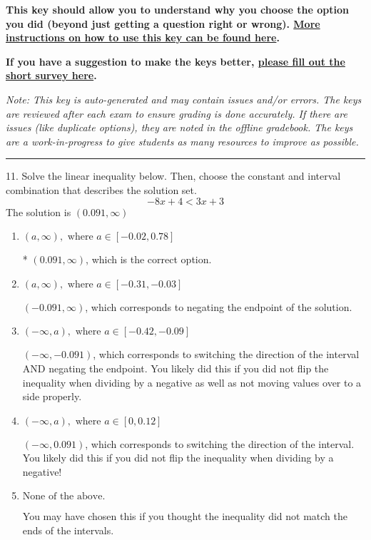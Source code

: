 \documentclass{article}[14pt]
\begin{document}
\textbf{This key should allow you to understand why you choose the option you did (beyond just getting a question right or wrong). \href{https://xronos.clas.ufl.edu/mac1105spring2020/courseDescriptionAndMisc/Exams/LearningFromResults}{More instructions on how to use this key can be found here}.}

\textbf{If you have a suggestion to make the keys better, \href{https://forms.gle/CZkbZmPbC9XALEE88}{please fill out the short survey here}.}

\textit{Note: This key is auto-generated and may contain issues and/or errors. The keys are reviewed after each exam to ensure grading is done accurately. If there are issues (like duplicate options), they are noted in the offline gradebook. The keys are a work-in-progress to give students as many resources to improve as possible.}

\rule{\textwidth}{0.4pt}

11. Solve the linear inequality below. Then, choose the constant and interval combination that describes the solution set.
$$ -8x + 4 < 3x + 3 $$ 
The solution is $ (0.091, \infty) $ 

\begin{enumerate}[label=\Alph*.] 
\item $ (a, \infty), \text{ where } a \in [-0.02, 0.78] $ 

 * $(0.091, \infty)$, which is the correct option. 
\item $ (a, \infty), \text{ where } a \in [-0.31, -0.03] $ 

  $(-0.091, \infty)$, which corresponds to negating the endpoint of the solution. 
\item $ (-\infty, a), \text{ where } a \in [-0.42, -0.09] $ 

  $(-\infty, -0.091)$, which corresponds to switching the direction of the interval AND negating the endpoint. You likely did this if you did not flip the inequality when dividing by a negative as well as not moving values over to a side properly. 
\item $ (-\infty, a), \text{ where } a \in [0, 0.12] $ 

  $(-\infty, 0.091)$, which corresponds to switching the direction of the interval. You likely did this if you did not flip the inequality when dividing by a negative! 
\item $ \text{None of the above}. $ 

 You may have chosen this if you thought the inequality did not match the ends of the intervals. 
\end{enumerate} 
 
\end{document}
